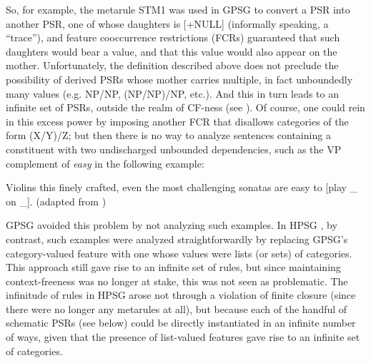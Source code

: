 \documentclass[output=paper,biblatex,babelshorthands,newtxmath,draftmode,colorlinks,citecolor=brown]{langscibook}
\begin{document}
So, for example, the metarule STM1 was used in GPSG to convert a PSR into another PSR, one of whose daughters is [+NULL] (informally speaking, a ``trace''), and feature cooccurrence restrictions (FCRs) guaranteed that such daughters would bear a \slasch value, and that this \slasch value would also appear on the mother. Unfortunately, the  definition described above does not preclude the possibility of derived PSRs whose mother carries multiple, in fact unboundedly many
\slasch values (e.g. NP/NP, (NP/NP)/NP, etc.). And this in turn leads to an infinite set of PSRs, outside the realm of CF-ness (see \citealt{Ristad86}).  Of course, one could rein in this excess power by imposing another FCR that disallows categories of the form (X/Y)/Z; but then there is no way to analyze sentences containing a constituent with two undischarged unbounded dependencies, such as the VP complement of \emph{easy} in the following example:

\ea
\label{ex-violins}
Violins this finely crafted, even the most challenging sonatas are easy to [play \_ on \_]. (adapted from \citealt[]{ps2})
\z

\noindent
GPSG avoided this problem by not analyzing such examples. In HPSG \citep{Pollard85a-u}, by contrast, such examples were analyzed straightforwardly by replacing GPSG's category-valued \slasch feature with one whose values were lists (or sets) of categories. This approach still gave rise to an infinite set of rules, but since maintaining context-freeness was no longer at stake, this was not seen as problematic. The infinitude of rules in HPSG arose not through a violation of finite closure (since there were no longer any metarules at all), but because each of the handful of schematic PSRs (see below) could be directly instantiated in an infinite number of ways, given that the presence of list-valued
features gave rise to an infinite set of categories.
\end{document}
